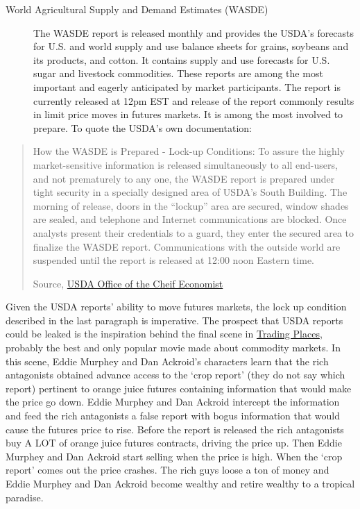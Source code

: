 \documentclass[
]{book}
\begin{document}
\begin{description}
\item[World Agricultural Supply and Demand Estimates (WASDE)]
The WASDE report is released monthly and provides the USDA's forecasts for U.S. and world supply and use balance sheets for grains, soybeans and its products, and cotton. It contains supply and use forecasts for U.S. sugar and livestock commodities. These reports are among the most important and eagerly anticipated by market participants. The report is currently released at 12pm EST and release of the report commonly results in limit price moves in futures markets. It is among the most involved to prepare. To quote the USDA's own documentation:
\end{description}

\begin{quote}
How the WASDE is Prepared - Lock-up Conditions: To assure the highly market-sensitive information is released simultaneously to all end-users, and not prematurely to any one, the WASDE report is prepared under tight security in a specially designed area of USDA's South Building. The morning of release, doors in the ``lockup'' area are secured, window shades are sealed, and telephone and Internet communications are blocked. Once analysts present their credentials to a guard, they enter the secured area to finalize the WASDE report. Communications with the outside world are suspended until the report is released at 12:00 noon Eastern time.

Source, \href{http://www.usda.gov/oce/commodity/wasde/prepared.htm}{USDA Office of the Cheif Economist}
\end{quote}

Given the USDA reports' ability to move futures markets, the lock up condition described in the last paragraph is imperative. The prospect that USDA reports could be leaked is the inspiration behind the final scene in \href{https://www.youtube.com/watch?v=1tmI867fAYU}{Trading Places}, probably the best and only popular movie made about commodity markets. In this scene, Eddie Murphey and Dan Ackroid's characters learn that the rich antagonists obtained advance access to the `crop report' (they do not say which report) pertinent to orange juice futures containing information that would make the price go down. Eddie Murphey and Dan Ackroid intercept the information and feed the rich antagonists a false report with bogus information that would cause the futures price to rise. Before the report is released the rich antagonists buy A LOT of orange juice futures contracts, driving the price up. Then Eddie Murphey and Dan Ackroid start selling when the price is high. When the `crop report' comes out the price crashes. The rich guys loose a ton of money and Eddie Murphey and Dan Ackroid become wealthy and retire wealthy to a tropical paradise.
\end{document}
